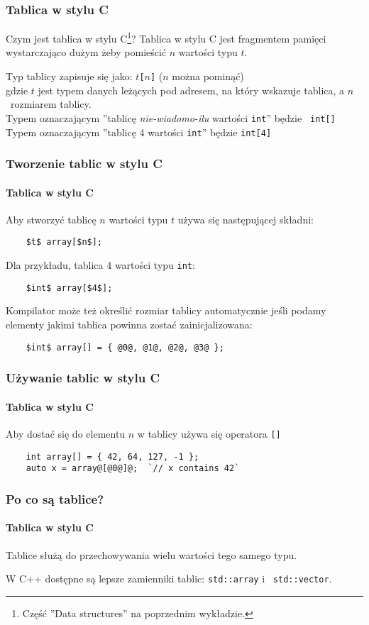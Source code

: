 \documentclass[aspectratio=169]{beamer}
\begin{document}
\begin{frame}
    \frametitle{Tablica w stylu C}

    Czym jest tablica w stylu C\footnote{Część ''Data structures'' na poprzednim
    wykładzie.}? Tablica w stylu C jest fragmentem pamięci wystarczająco
    dużym żeby pomieścić $n$ wartości typu $t$.
    \label{what_is_a_c_style_array}

    \vspace{1em}

    Typ tablicy zapisuje się jako: {\tt $t$[$n$]} ($n$ można pominąć)\\
    gdzie $t$ jest typem danych leżących pod adresem, na który wskazuje tablica,
    a $n$~rozmiarem tablicy.\\
    Typem oznaczającym ''tablicę \emph{nie-wiadomo-ilu} wartości {\tt int}'' będzie {\tt
    int[]}\\
    Typem oznaczającym ''tablicę 4 wartości {\tt int}'' będzie {\tt int[4]}
\end{frame}

\begin{frame}[fragile]
    \frametitle{Tworzenie tablic w stylu C}
    \framesubtitle{Tablica w stylu C}

    Aby stworzyć tablicę $n$ wartości typu $t$ używa się następującej składni:

    \begin{lstlisting}
    $t$ array[$n$];
    \end{lstlisting}

    Dla przykładu, tablica 4 wartości typu {\tt int}:

    \begin{lstlisting}
    $int$ array[$4$];
    \end{lstlisting}

    Kompilator może też określić rozmiar tablicy automatycznie jeśli podamy
    elementy jakimi tablica powinna zostać zainicjalizowana:

    \begin{lstlisting}
    $int$ array[] = { @0@, @1@, @2@, @3@ };
    \end{lstlisting}
\end{frame}

\begin{frame}[fragile]
    \frametitle{Używanie tablic w stylu C}
    \framesubtitle{Tablica w stylu C}

    Aby dostać się do elementu $n$ w tablicy używa się operatora {\tt []}

    \begin{lstlisting}
    int array[] = { 42, 64, 127, -1 };
    auto x = array@[@0@]@;  `// x contains 42`
    \end{lstlisting}
\end{frame}

\begin{frame}
    \frametitle{Po co są tablice?}
    \framesubtitle{Tablica w stylu C}

    Tablice służą do przechowywania wielu wartości tego samego typu.

    \vspace{1em}

    W C++ dostępne są lepsze zamienniki tablic: {\tt std::array} i {\tt
    std::vector}.
\end{frame}
\end{document}
